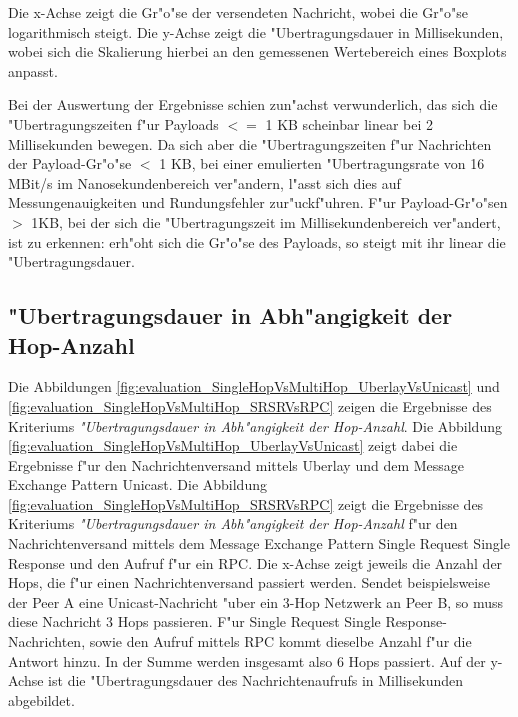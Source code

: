 Die x-Achse zeigt die Gr"o"se der versendeten Nachricht, wobei die Gr"o"se logarithmisch steigt. Die y-Achse zeigt die "Uber\-tra\-gungs\-dauer in Millisekunden, wobei sich die Skalierung hierbei an den gemessenen Wertebereich eines Boxplots anpasst.

Bei der Auswertung der Ergebnisse schien zun"achst verwunderlich, das sich die "Ubertragungszeiten f"ur Payloads $<=$ 1 KB scheinbar linear bei 2 Millisekunden bewegen. Da sich aber die "Ubertragungszeiten f"ur Nachrichten der Payload-Gr"o"se $<$ 1 KB, bei einer emulierten "Ubertragungsrate von 16 MBit/s im Nanosekundenbereich ver"andern, l"asst sich dies auf Messungenauigkeiten und Rundungsfehler zur"uckf"uhren. F"ur Payload-Gr"o"sen $>$ 1KB, bei der sich die "Ubertragungszeit  im Millisekundenbereich ver"andert, ist zu erkennen: erh"oht sich die Gr"o"se des Payloads, so steigt mit ihr linear die "Uber\-tra\-gungs\-dauer.

\subsection{"Ubertragungsdauer in Abh"angigkeit der Hop-Anzahl}



Die Abbildungen \ref{fig:evaluation_SingleHopVsMultiHop_UberlayVsUnicast} und \ref{fig:evaluation_SingleHopVsMultiHop_SRSRVsRPC} zeigen die Ergebnisse des Kriteriums \emph{"Ubertragungsdauer in Abh"angigkeit der Hop-Anzahl}. Die Abbildung \ref{fig:evaluation_SingleHopVsMultiHop_UberlayVsUnicast} zeigt dabei die Ergebnisse f"ur den Nachrichtenversand mittels Uberlay und dem Message Exchange Pattern Unicast. Die Abbildung \ref{fig:evaluation_SingleHopVsMultiHop_SRSRVsRPC} zeigt die Ergebnisse des Kriteriums \emph{"Ubertragungsdauer in Abh"angigkeit der Hop-Anzahl} f"ur den Nachrichtenversand mittels dem Message Exchange Pattern Single Request Single Response und den Aufruf f"ur ein RPC. Die  x-Achse zeigt jeweils die Anzahl der Hops, die f"ur einen Nachrichtenversand passiert werden. Sendet beispielsweise der Peer A eine Unicast-Nachricht "uber ein 3-Hop Netzwerk an Peer B, so muss diese Nachricht 3 Hops passieren. F"ur Single Request Single Response-Nachrichten, sowie den Aufruf mittels RPC kommt dieselbe Anzahl f"ur die Antwort hinzu. In der Summe werden insgesamt also 6 Hops passiert. Auf der y-Achse ist die "Uber\-tra\-gungs\-dauer des Nachrichtenaufrufs in Millisekunden abgebildet.

